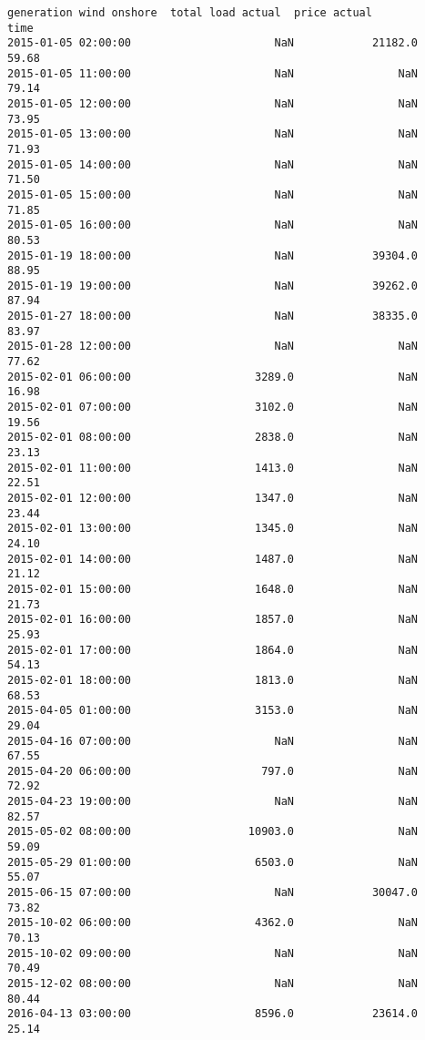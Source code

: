 \documentclass[11pt]{article}
\begin{document}
\begin{tcolorbox}[breakable, size=fbox, boxrule=.5pt, pad at break*=1mm, opacityfill=0]
\begin{Verbatim}[commandchars=\\\{\}]
                     generation wind onshore  total load actual  price actual
time
2015-01-05 02:00:00                      NaN            21182.0         59.68
2015-01-05 11:00:00                      NaN                NaN         79.14
2015-01-05 12:00:00                      NaN                NaN         73.95
2015-01-05 13:00:00                      NaN                NaN         71.93
2015-01-05 14:00:00                      NaN                NaN         71.50
2015-01-05 15:00:00                      NaN                NaN         71.85
2015-01-05 16:00:00                      NaN                NaN         80.53
2015-01-19 18:00:00                      NaN            39304.0         88.95
2015-01-19 19:00:00                      NaN            39262.0         87.94
2015-01-27 18:00:00                      NaN            38335.0         83.97
2015-01-28 12:00:00                      NaN                NaN         77.62
2015-02-01 06:00:00                   3289.0                NaN         16.98
2015-02-01 07:00:00                   3102.0                NaN         19.56
2015-02-01 08:00:00                   2838.0                NaN         23.13
2015-02-01 11:00:00                   1413.0                NaN         22.51
2015-02-01 12:00:00                   1347.0                NaN         23.44
2015-02-01 13:00:00                   1345.0                NaN         24.10
2015-02-01 14:00:00                   1487.0                NaN         21.12
2015-02-01 15:00:00                   1648.0                NaN         21.73
2015-02-01 16:00:00                   1857.0                NaN         25.93
2015-02-01 17:00:00                   1864.0                NaN         54.13
2015-02-01 18:00:00                   1813.0                NaN         68.53
2015-04-05 01:00:00                   3153.0                NaN         29.04
2015-04-16 07:00:00                      NaN                NaN         67.55
2015-04-20 06:00:00                    797.0                NaN         72.92
2015-04-23 19:00:00                      NaN                NaN         82.57
2015-05-02 08:00:00                  10903.0                NaN         59.09
2015-05-29 01:00:00                   6503.0                NaN         55.07
2015-06-15 07:00:00                      NaN            30047.0         73.82
2015-10-02 06:00:00                   4362.0                NaN         70.13
2015-10-02 09:00:00                      NaN                NaN         70.49
2015-12-02 08:00:00                      NaN                NaN         80.44
2016-04-13 03:00:00                   8596.0            23614.0         25.14

\end{Verbatim}
\end{tcolorbox}
\end{document}
